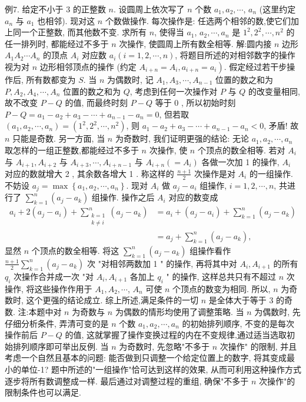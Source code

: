 例7. 给定不小于 3 的正整数 $n$. 设圆周上依次写了 $n$ 个数 $a_1, a_2, \cdots$, $a_n$ (这里约定 $a_n$ 与 $a_1$ 也相邻). 现对这 $n$ 个数做操作.
每次操作是: 任选两个相邻的数,使它们加上同一个正整数, 而其他数不变.
求所有 $n$, 使得当 $a_1$, $a_2, \cdots, a_n$ 是 $1^2, 2^2, \cdots, n^2$ 的任一排列时, 都能经过不多于 $n$ 次操作, 使圆周上所有数全相等.
解:圆内接 $n$ 边形 $A_1 A_2 \cdots A_n$ 的顶点 $A_i$ 对应数 $a_i(i=1,2, \cdots, n)$, 将题目所述的对相邻数字的操作视为对 $n$ 边形相邻顶点的操作 (约定 $A_{i+n}= \left.A_i, a_{i+n}=a_i\right)$.
假定经过若干步操作后, 所有数都变为 $S$.
当 $n$ 为偶数时, 记 $A_1, A_3, \cdots, A_{n-1}$ 位置的数之和为 $P, A_2, A_4, \cdots, A_n$ 位置的数之和为 $Q$, 考虑到任何一次操作对 $P$ 与 $Q$ 的改变量相同, 故不改变 $P-Q$ 的值, 而最终时刻 $P-Q$ 等于 0 , 所以初始时刻 $P-Q=a_1-a_2+ a_3-\cdots+a_{n-1}-a_n=0$, 但若取 $\left(a_1, a_2, \cdots, a_n\right)=\left(1^2, 2^2, \cdots, n^2\right)$, 则 $a_1- a_2+a_3-\cdots+a_{n-1}-a_n<0$, 矛盾! 故 $n$ 只能是奇数.
另一方面, 当 $n$ 为奇数时, 我们证明更强的结论: 无论 $a_1, a_2, \cdots, a_n$ 取怎样的一组正整数,都能经过不多于 $n$ 次操作, 使 $n$ 个顶点的数全相等.
若对 $A_i$ 与 $A_{i+1}, A_{i+2}$ 与 $A_{i+3}, \cdots, A_{i+n-1}$ 与 $A_{i+n}\left(=A_i\right)$ 各做一次加 1 的操作, $A_i$ 对应的数就增大 2 , 其余数各增大 1 . 称这样的 $\frac{n+1}{2}$ 次操作是对 $A_i$ 的一组操作.
不妨设 $a_j=\max \left\{a_1, a_2, \cdots, a_n\right\}$. 现对 $A_i$ 做 $a_j-a_i$ 组操作, $i=1,2, \cdots, n$, 共进行了 $\sum_{k=1}^n\left(a_j-a_k\right)$ 组操作.
操作之后 $A_i$ 对应的数变成
$$
\begin{aligned}
a_i+2\left(a_j-a_i\right)+\sum_{\substack{k=1 \\
k \neq i}}^n\left(a_j-a_k\right) & =a_i+\left(a_j-a_i\right)+\sum_{k=1}^n\left(a_j-a_k\right) \\
& =a_j+\sum_{k=1}^n\left(a_j-a_k\right),
\end{aligned}
$$
显然 $n$ 个顶点的数全相等.
将这 $\sum_{k=1}^n\left(a_j-a_k\right)$ 组操作看作 $\frac{n+1}{2} \sum_{k=1}^n\left(a_j-a_k\right)$ 次 "对相邻两数加 1 " 的操作, 再将其中对 $A_i, A_{i+1}$ 的所有 $q_i$ 次操作合并成一次 "对 $A_i, A_{i+1}$ 各加上 $q_i$ " 的操作, 这样总共只有不超过 $n$ 次操作, 将这些操作作用于 $A_1, A_2, \cdots$, $A_n$ 可使 $n$ 个顶点的数变为相同.
所以, $n$ 为奇数时, 这个更强的结论成立.
综上所述,满足条件的一切 $n$ 是全体大于等于 3 的奇数.
注:本题中对 $n$ 为奇数与 $n$ 为偶数的情形均使用了调整策略.
当 $n$ 为偶数时, 先仔细分析条件, 弄清可变的是 $n$ 个数 $a_1, a_2, \cdots, a_n$ 的初始排列顺序, 不变的是每次操作前后 $P-Q$ 的值, 这就掌握了操作变换过程的内在不变规律,通过适当选取初始排列顺序即可举出反例.
当 $n$ 为奇数时, 先忽略"不多于 $n$ 次操作" 的限制, 并且考虑一个自然且基本的问题: 能否做到只调整一个给定位置上的数字, 将其变成最小的单位-1? 题中所述的"一组操作"恰可达到这样的效果, 从而可利用这种操作方式逐步将所有数调整成一样.
最后通过对调整过程的重组, 确保"不多于 $n$ 次操作"的限制条件也可以满足.



